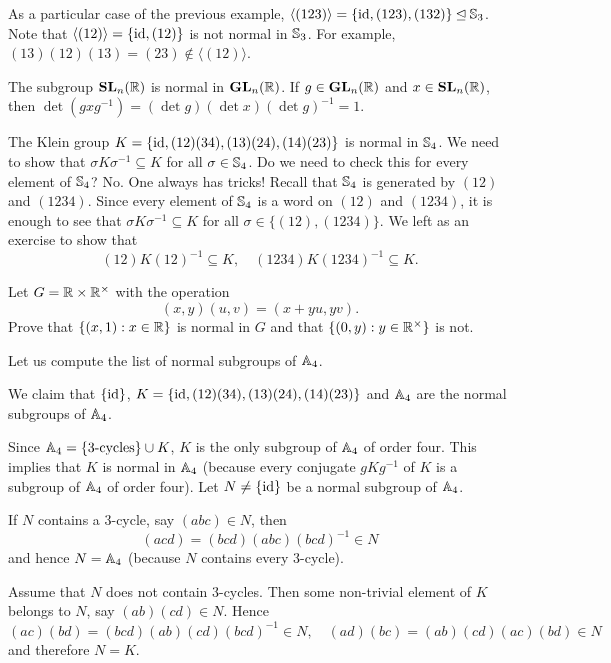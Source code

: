 \begin{example}
As a particular case of the previous example, 
$\langle (123)\rangle=\{\operatorname{id},(123),(132)\}\unlhd\mathbb{S}_3$. Note that
$\langle (12)\rangle=\{\operatorname{id},(12)\}$ is not normal in $\mathbb{S}_3$.  
For example, $(13)(12)(13)=(23)\not\in\langle(12)\rangle$.
\end{example}

\begin{example}
The subgroup $\mathbf{SL}_n(\mathbb{R})$ is normal in $\mathbf{GL}_n(\mathbb{R})$. If $g\in\mathbf{GL}_n(\mathbb{R})$ and $x\in\mathbf{SL}_n(\mathbb{R})$, then $\det(gxg^{-1})=(\det g)(\det x)(\det g)^{-1}=1$.
\end{example}

\begin{example}
The Klein group $K=\{\operatorname{id},(12)(34),(13)(24),(14)(23)\}$ is normal in
$\mathbb{S}_4$. We need to show that 
$\sigma K\sigma^{-1}\subseteq K$ for all $\sigma\in\mathbb{S}_4$. Do we need to check this for every element of $\mathbb{S}_4$? No. One always has tricks! 
Recall that $\mathbb{S}_4$ is generated by $(12)$ and $(1234)$. Since
every element of  $\mathbb{S}_4$ is a word on $(12)$ and 
$(1234)$,
it is enough to see that
$\sigma K\sigma^{-1}\subseteq K$ for all $\sigma\in\{(12),(1234)\}$. We left as an exercise to show that 
\[
(12)K(12)^{-1}\subseteq K,\quad
(1234)K(1234)^{-1}\subseteq K.
\]
\end{example}

\begin{exercise}
Let $G=\mathbb{R}\times\mathbb{R}^\times$ with the operation 
\[
(x,y)(u,v)=(x+yu,yv).
\]
Prove that $\{(x,1):x\in\mathbb{R}\}$ is normal in $G$ and that
$\{(0,y):y\in\mathbb{R}^\times\}$ is not. 
\end{exercise}

Let us compute the list of normal subgroups of $\mathbb{A}_4$.

\begin{example}
We claim that 
$\{\operatorname{id}\}$, $K=\{\operatorname{id},(12)(34),(13)(24),(14)(23)\}$ and $\mathbb{A}_4$ 
are the normal subgroups of $\mathbb{A}_4$.

Since $\mathbb{A}_4=\{\text{3-cycles}\}\cup K$, $K$ is the only subgroup
of $\mathbb{A}_4$ of order four. This implies that $K$ is normal in $\mathbb{A}_4$ (because every conjugate $gKg^{-1}$ of $K$ is a subgroup of 
$\mathbb{A}_4$ of order four). Let $N\ne\{\operatorname{id}\}$ be a normal subgroup of 
$\mathbb{A}_4$. 

If $N$ contains a 3-cycle, say 
$(abc)\in N$, then 
\[
(acd)=(bcd)(abc)(bcd)^{-1}\in N
\]
and hence $N=\mathbb{A}_4$ (because $N$ contains every 3-cycle). 

Assume that $N$ does not contain 3-cycles. 
Then some non-trivial element of $K$ belongs to $N$, say 
$(ab)(cd)\in N$. Hence 
\[
(ac)(bd)=(bcd)(ab)(cd)(bcd)^{-1}\in N,\quad
(ad)(bc)=(ab)(cd)(ac)(bd)\in N
\]
and therefore $N=K$.
\end{example}

